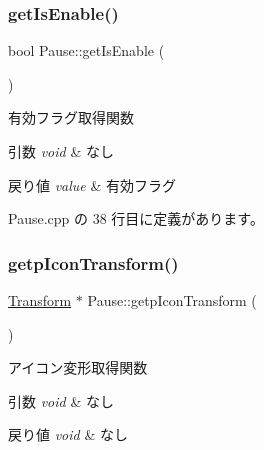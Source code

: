 \mbox{\label{class_pause_ad0dfae63dc2370deb96d5fde4fffe1df}} 
\subsubsection{\texorpdfstring{get\+Is\+Enable()}{getIsEnable()}}
{\footnotesize\ttfamily bool Pause\+::get\+Is\+Enable (\begin{DoxyParamCaption}{ }\end{DoxyParamCaption})}



有効フラグ取得関数 


\begin{DoxyParams}{引数}
{\em void} & なし \\
\hline
\end{DoxyParams}

\begin{DoxyRetVals}{戻り値}
{\em value} & 有効フラグ \\
\hline
\end{DoxyRetVals}


 Pause.\+cpp の 38 行目に定義があります。

\mbox{\label{class_pause_af6f43901ddcf224b3915e0248effce17}} 
\subsubsection{\texorpdfstring{getp\+Icon\+Transform()}{getpIconTransform()}}
{\footnotesize\ttfamily \mbox{\hyperlink{class_transform}{Transform}} $\ast$ Pause\+::getp\+Icon\+Transform (\begin{DoxyParamCaption}{ }\end{DoxyParamCaption})}



アイコン変形取得関数 


\begin{DoxyParams}{引数}
{\em void} & なし \\
\hline
\end{DoxyParams}

\begin{DoxyRetVals}{戻り値}
{\em void} & なし \\
\hline
\end{DoxyRetVals}


